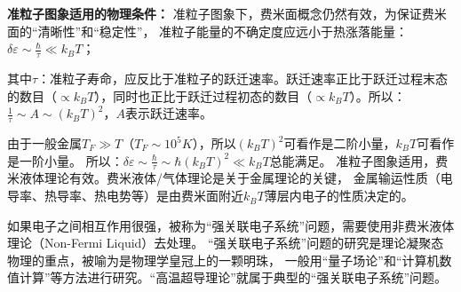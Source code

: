 
\textbf{准粒子图象适用的物理条件：}
准粒子图象下，费米面概念仍然有效，为保证费米面的``清晰性''和``稳定性''，
准粒子能量的不确定度应远小于热涨落能量：$\delta \varepsilon  \sim \frac{\hbar }{\tau } \ll k_B T$；

其中$\tau$：准粒子寿命，应反比于准粒子的跃迁速率。跃迁速率正比于跃迁过程末态的数目（$ \propto k_B T$），同时也正比于跃迁过程初态的数目（$ \propto k_B T$）。所以：$\frac{1}{\tau } \sim A \sim \left( {k_B T} \right)^2 $，$A$表示跃迁速率。

由于一般金属$T_F  \gg T$（$T_F  \sim 10^5 K$），所以$\left( {k_B T} \right)^2 $可看作是二阶小量，$k_B T$可看作是一阶小量。
所以：$\delta \varepsilon  \sim \frac{\hbar }{\tau } \sim \hbar \left( {k_B T} \right)^2  \ll k_B T$总能满足。
准粒子图象适用，费米液体理论有效。费米液体/气体理论是关于金属理论的关键，
金属输运性质（电导率、热导率、热电势等）是由费米面附近$k_B T$薄层内电子的性质决定的。

如果电子之间相互作用很强，被称为``强关联电子系统''问题，需要使用非费米液体理论（Non-Fermi Liquid）去处理。
``强关联电子系统''问题的研究是理论凝聚态物理的重点，被喻为是物理学皇冠上的一颗明珠，
一般用``量子场论''和``计算机数值计算''等方法进行研究。``高温超导理论''就属于典型的``强关联电子系统''问题。
